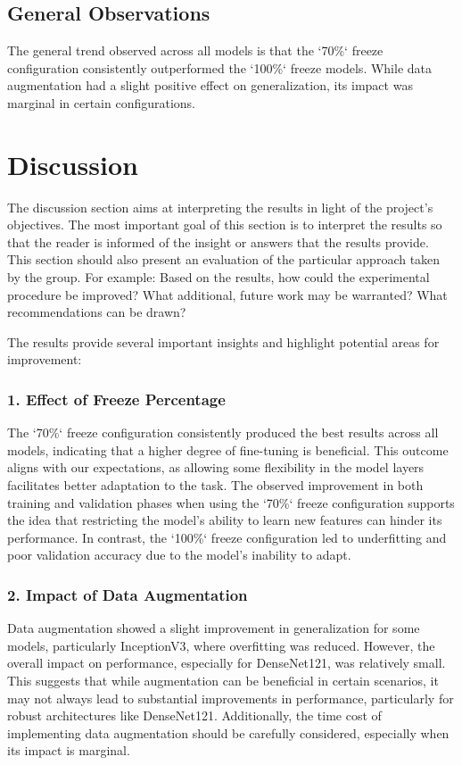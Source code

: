\subsection{General Observations}

The general trend observed across all models is that the `70\%` freeze configuration consistently outperformed the
`100\%` freeze models. While data augmentation had a slight positive effect on generalization, its impact was marginal in certain configurations.

\section{Discussion}
The discussion section aims at interpreting the results in light of the project's objectives. The most important goal of this section is to interpret the results so that the reader is informed of the insight or answers that the results provide. This section should also present an evaluation of the particular approach taken by the group. For example: Based on the results, how could the experimental procedure be improved? What additional, future work may be warranted? What recommendations can be drawn?

The results provide several important insights and highlight potential areas for improvement:

\subsubsection{1. Effect of Freeze Percentage}

The `70\%` freeze configuration consistently produced the best results across all models, indicating that a higher degree of fine-tuning is beneficial. This outcome aligns with our expectations, as allowing some flexibility in the model layers facilitates better adaptation to the task. The observed improvement in both training and validation phases when using the `70\%` freeze configuration supports the idea that restricting the model's ability to learn new features can hinder its performance. In contrast, the `100\%` freeze configuration led to underfitting and poor validation accuracy due to the model's inability to adapt.

\subsubsection{2. Impact of Data Augmentation}

Data augmentation showed a slight improvement in generalization for some models, particularly InceptionV3, where overfitting was reduced. However, the overall impact on performance, especially for DenseNet121, was relatively small. This suggests that while augmentation can be beneficial in certain scenarios, it may not always lead to substantial improvements in performance, particularly for robust architectures like DenseNet121. Additionally, the time cost of implementing data augmentation should be carefully considered, especially when its impact is marginal.

